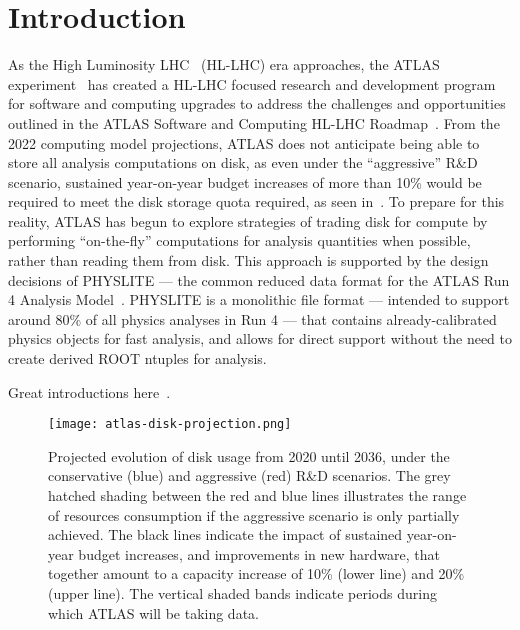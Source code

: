 \section{Introduction}\label{sec:introduction}

As the High Luminosity LHC~\cite{ZurbanoFernandez:2020cco} (HL-LHC) era approaches, the ATLAS experiment~\cite{PERF-2007-01} has created a HL-LHC focused research and development program~\cite{ATLAS:2020pnm} for software and computing upgrades to address the challenges and opportunities outlined in the ATLAS Software and Computing HL-LHC Roadmap~\cite{CERN-LHCC-2022-005}.
From the 2022 computing model projections, ATLAS does not anticipate being able to store all analysis computations on disk, as even under the ``aggressive'' R\&D scenario, sustained year-on-year budget increases of more than 10\% would be required to meet the disk storage quota required, as seen in~.
To prepare for this reality, ATLAS has begun to explore strategies of trading disk for compute by performing ``on-the-fly'' computations for analysis quantities when possible, rather than reading them from disk.
This approach is supported by the design decisions of PHYSLITE --- the common reduced data format for the ATLAS Run 4 Analysis Model~\cite{Schaarschmidt:2024vzr}.
PHYSLITE is a monolithic file format --- intended to support around 80\% of all physics analyses in Run 4 --- that contains already-calibrated physics objects for fast analysis, and allows for direct support without the need to create derived ROOT ntuples for analysis.


Great introductions here~\cite{nanobind}.

\begin{figure}
    \centering
    \texttt{[image: atlas-disk-projection.png]}
    \caption{Projected evolution of disk usage from 2020 until 2036, under the conservative (blue) and aggressive (red) R\&D scenarios.
The grey hatched shading between the red and blue lines illustrates the range of resources consumption if the aggressive scenario is only partially achieved.
The black lines indicate the impact of sustained year-on-year budget increases, and improvements in new hardware, that together amount to a capacity increase of 10\% (lower line) and 20\% (upper line).
The vertical shaded bands indicate periods during which ATLAS will be taking data.~\cite{CERN-LHCC-2022-005}}
    \label{fig:atlas-disk-projection}
\end{figure}
